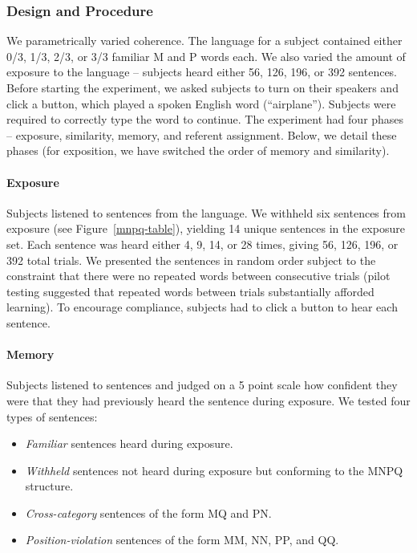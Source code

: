 \documentclass[man,floatsintext]{apa6}
\begin{document}
\subsubsection{Design and Procedure}

We parametrically varied coherence. The language for a subject contained either 0/3, 1/3, 2/3, or 3/3 familiar M and P words each. We also varied the amount of exposure to the language -- subjects heard either 56, 126, 196, or 392 sentences. Before starting the experiment, we asked subjects to turn on their speakers and click a button, which played a spoken English word (``airplane''). Subjects were required to correctly type the word to continue. The experiment had four phases -- exposure, similarity, memory, and referent assignment. Below, we detail these phases (for exposition, we have switched the order of memory and similarity).

\paragraph{Exposure}
Subjects listened to sentences from the language. We withheld 
six sentences from exposure (see Figure~\ref{mnpq-table}), yielding 14 unique sentences in the exposure set. Each sentence was heard either 4, 9, 14, or 28 times, giving 56, 126, 196, or 392 total trials. We presented the sentences in random order subject to the constraint that there were no repeated words between consecutive trials (pilot testing suggested that repeated words between trials substantially afforded learning). To encourage compliance, subjects had to click a button to hear each sentence.

\paragraph{Memory}
Subjects listened to sentences and judged on a 5 point scale how confident they were that they had previously heard the sentence during exposure. We tested four types of sentences:

\begin{itemize}
\item \emph{Familiar} sentences heard during exposure.
\item \emph{Withheld} sentences not heard during exposure but conforming to the MNPQ structure.
\item \emph{Cross-category} sentences of the form MQ and PN.
\item \emph{Position-violation} sentences of the form MM, NN, PP, and QQ.
\end{itemize}
\end{document}
